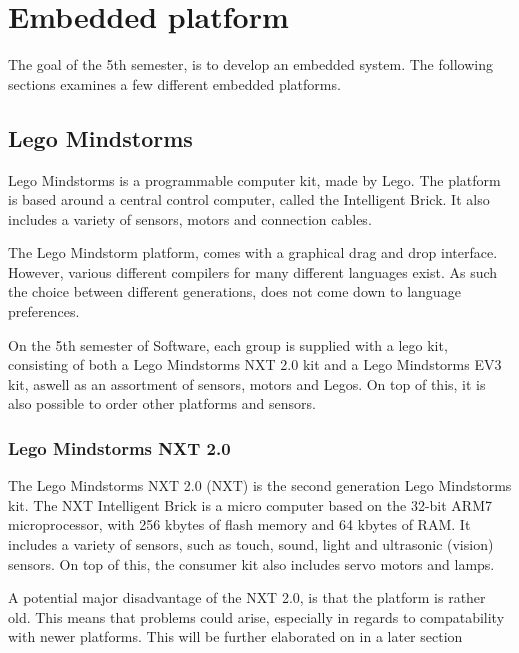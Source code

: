 \section{Embedded platform}
The goal of the 5th semester, is to develop an embedded system.
The following sections examines a few different embedded platforms.

\subsection{Lego Mindstorms}
Lego Mindstorms is a programmable computer kit, made by Lego.
The platform is based around a central control computer, called the Intelligent Brick.
It also includes a variety of sensors, motors and connection cables.

The Lego Mindstorm platform, comes with a graphical drag and drop interface.
However, various different compilers for many different languages exist.
As such the choice between different generations, does not come down to language preferences.

On the 5th semester of Software, each group is supplied with a lego kit, consisting of both a Lego Mindstorms NXT 2.0 kit and a Lego Mindstorms EV3 kit, aswell as an assortment of sensors, motors and Legos.
On top of this, it is also possible to order other platforms and sensors.

\subsubsection{Lego Mindstorms NXT 2.0}
The Lego Mindstorms NXT 2.0 (NXT) is the second generation Lego Mindstorms kit.
The NXT Intelligent Brick is a micro computer based on the 32-bit ARM7 microprocessor, with 256 kbytes of flash memory and 64 kbytes of RAM\cite{nxt2userguide}.
It includes a variety of sensors, such as touch, sound, light and ultrasonic (vision) sensors.
On top of this, the consumer kit also includes servo motors and lamps.

A potential major disadvantage of the NXT 2.0, is that the platform is rather old.
This means that problems could arise, especially in regards to compatability with newer platforms.
This will be further elaborated on in a later section

